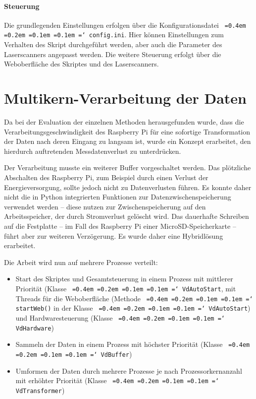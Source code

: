 \documentclass[a4paper,12pt,bibliography=totoc, listof=totoc,titlepage,pointlessnumbers]{scrreprt}
\newcommand*\justify{%
  \fontdimen2\font=0.4em%
  \fontdimen3\font=0.2em%
  \fontdimen4\font=0.1em%
  \fontdimen7\font=0.1em%
  \hyphenchar\font=`\-%
}
\newcommand{\code}[1]{\texttt{\justify{#1}}}
\begin{document}
\paragraph{Steuerung}
Die grundlegenden Einstellungen erfolgen über die Konfigurationsdatei \code{config.ini}. Hier können Einstellungen zum Verhalten des Skript durchgeführt werden, aber auch die Parameter des Laser\-scan\-ners angepasst werden. Die weitere Steuerung erfolgt über die Weboberfläche des Skriptes und des Laser\-scan\-ners.

\section{Multikern-Verarbeitung der Daten}
\label{s:multikern}
Da bei der Evaluation der einzelnen Methoden herausgefunden wurde, dass die Verarbeitungsgeschwindigkeit des Rasp\-berry Pi für eine sofortige Transformation der Daten nach deren Eingang zu langsam ist, wurde ein Konzept erarbeitet, den hierdurch auftretenden Messdatenverlust zu unterdrücken.

Der Verarbeitung musste ein weiterer Buffer vorgeschaltet werden. Das plötzliche Abschalten des Rasp\-berry Pi, zum Beispiel durch einen Verlust der Energieversorgung, sollte jedoch nicht zu Datenverlusten führen. Es konnte daher nicht die in Python integrierten Funktionen zur Datenzwischenspeicherung verwendet werden -- diese nutzen zur Zwischenspeicherung auf den Arbeitsspeicher, der durch Stromverlust gelöscht wird. Das dauerhafte Schreiben auf die Festplatte -- im Fall des Rasp\-berry Pi einer MicroSD-Speicherkarte -- führt aber zur weiteren Verzögerung. Es wurde daher eine Hybridlösung erarbeitet.

Die Arbeit wird nun auf mehrere Prozesse verteilt:
\begin{itemize}
 \item Start des Skriptes und Gesamtsteuerung in einem Prozess mit mittlerer Priorität (Klasse \code{VdAutoStart}, mit Threads für die Weboberfläche (Methode \code{startWeb()} in der Klasse \code{VdAutoStart}) und Hardwaresteuerung (Klasse \code{VdHardware})
 \item Sammeln der Daten in einem Prozess mit höchster Priorität (Klasse \code{VdBuffer})
 \item Umformen der Daten durch mehrere Prozesse je nach Prozessorkernanzahl mit erhöhter Priorität (Klasse \code{VdTransformer})
\end{itemize}
\end{document}
